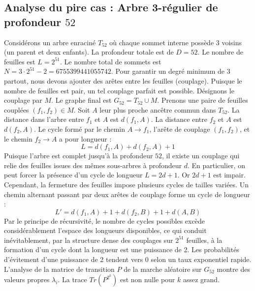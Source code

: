 \documentclass[11pt,a4paper]{article}
\begin{document}
\subsection{Analyse du pire cas : Arbre 3-régulier de profondeur $52$}
Considérons un arbre enraciné $T_52$ où chaque sommet interne possède 3 voisins (un parent et deux enfants).
La profondeur totale est de $D = 52$.
Le nombre de feuilles est $L = 2^{51}$.
Le nombre total de sommets est $N = 3 \cdot 2^{51} - 2 = 6755399441055742$.
Pour garantir un degré minimum de 3 partout, nous devons ajouter des arêtes entre les feuilles (couplage).
Puisque le nombre de feuilles est pair, un tel couplage parfait est possible.
Désignons le couplage par $M$. Le graphe final est $G_52 = T_52 \cup M$.
Prenons une paire de feuilles couplées $(f_1, f_2) \in M$.
Soit $A$ leur plus proche ancêtre commun dans $T_52$.
La distance dans l'arbre entre $f_1$ et $A$ est $d(f_1, A)$.
La distance entre $f_2$ et $A$ est $d(f_2, A)$.
Le cycle formé par le chemin $A \to f_1$, l'arête de couplage $(f_1, f_2)$, et le chemin $f_2 \to A$ a pour longueur :
$$ L = d(f_1, A) + d(f_2, A) + 1 $$
Puisque l'arbre est complet jusqu'à la profondeur $52$, il existe un couplage qui relie des feuilles issues des mêmes sous-arbres à profondeur $d$.
En particulier, on peut forcer la présence d'un cycle de longueur $L = 2d + 1$. Or $2d+1$ est impair.
Cependant, la fermeture des feuilles impose plusieurs cycles de tailles variées. Un chemin alternant passant par deux arêtes de couplage forme un cycle de longueur :
$$ L' = d(f_1, A) + 1 + d(f_2, B) + 1 + d(A, B) $$
Par le principe de récursivité, le nombre de cycles possibles excède considérablement l'espace des longueurs disponibles, ce qui conduit inévitablement, par la structure dense des couplages sur $2^{51}$ feuilles, à la formation d'un cycle dont la longueur est une puissance de 2. Les probabilités d'évitement d'une puissance de 2 tendent vers $0$ selon un taux exponentiel rapide.
L'analyse de la matrice de transition $P$ de la marche aléatoire sur $G_52$ montre des valeurs propres $\lambda_i$. La trace $Tr(P^{2^k})$ est non nulle pour $k$ assez grand.
\end{document}
